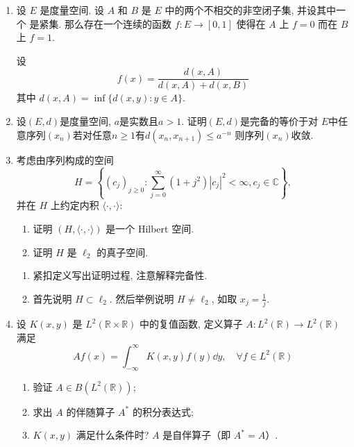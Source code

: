 \begin{enumerate}
\begin{answer}
        \end{answer}
    \item 设 $E$ 是度量空间. 设 $A$ 和 $B$ 是 $E$ 中的两个不相交的非空闭子集, 并设其中一个 是紧集. 那么存在一个连续的函数 $f: E \rightarrow[0,1]$ 使得在 $A$ 上 $f=0$ 而在 $B$ 上 $f=1$. 
        \begin{hint}
            设
            \[
                f(x)=\frac{d(x, A)}{d(x, A)+d(x, B)}
            \]
            其中 $d(x, A)=\inf \{d(x, y): y \in A\} .$
        \end{hint}
    \item 设$(E,d)$是度量空间, $a$是实数且$a>1$.  证明$(E,d)$是完备的等价于对 $E$中任意序列$(x_n)$若对任意$n\geq 1$有$d(x_n,x_{n+1})\leq a^{-n}$ 则序列$(x_n)$收敛.
    \item 考虑由序列构成的空间
    \[
        H=\left\{\left(c_{j}\right)_{j \geq 0}: \sum_{j=0}^{\infty}\left(1+j^{2}\right)\left|c_{j}\right|^{2}<\infty, c_{j} \in \mathbb{C}\right\},
    \]
    并在 $H$ 上约定内积 $\langle\cdot,\cdot\rangle :$
        \begin{enumerate}
            \item 证明 $(H,\langle\cdot, \cdot\rangle)$ 是一个 Hilbert 空间.
            \item 证明 $H$ 是 $\ell_{2}$ 的真子空间.
        \end{enumerate}
        \begin{answer}
            \begin{enumerate}
                \item 紧扣定义写出证明过程, 注意解释完备性.
                \item 首先说明 $H \subset \ell_{2}$. 然后举例说明 $H \neq  \ell_{2}$, 如取 $x_{j}=\frac{1}{j}$.\qedhere
            \end{enumerate}
        \end{answer}
    \item 设 $K(x, y)$ 是 $L^{2}(\mathbb{R} \times \mathbb{R})$ 中的复值函数, 定义算子 $A: L^{2}(\mathbb{R}) \rightarrow L^{2}(\mathbb{R})$ 满足
    \[
    A f(x)=\int_{-\infty}^{\infty} K(x, y) f(y) \dd y, \quad \forall f \in L^{2}(\mathbb{R})
    \]
        \begin{enumerate}
            \item 验证 $A \in B\left(L^{2}(\mathbb{R})\right)$;
            \item 求出 $A$ 的伴随算子 $A^{*}$ 的积分表达式;
            \item $K(x, y)$ 满足什么条件时? $A$ 是自伴算子（即 $A^{*}=A$）.
        \end{enumerate}

\end{enumerate}
